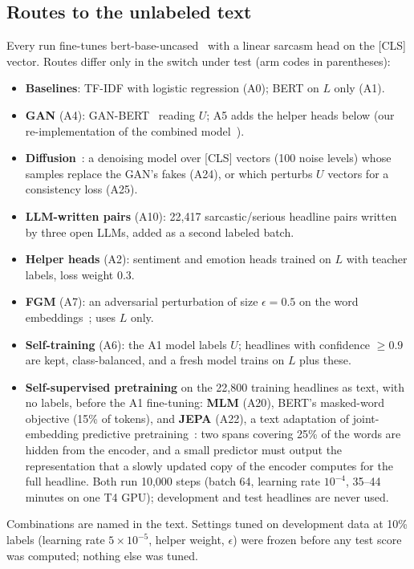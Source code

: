 \documentclass[conference]{IEEEtran}
\newcommand{\A}[1]{\textsf{#1}}                         %
\begin{document}
\subsection{Routes to the unlabeled text}
Every run fine-tunes bert-base-uncased~\cite{devlin2019bert} with a linear sarcasm head on the [CLS] vector. Routes differ only in the switch under test (arm codes in parentheses):
\begin{itemize}
\item \textbf{Baselines}: TF-IDF with logistic regression (\A{A0}); BERT on $L$ only (\A{A1}).
\item \textbf{GAN} (\A{A4}): GAN-BERT~\cite{croce2020ganbert} reading $U$; \A{A5} adds the helper heads below (our re-implementation of the combined model~\cite{irfan2025seed}).
\item \textbf{Diffusion}~\cite{ho2020ddpm}: a denoising model over [CLS] vectors (100 noise levels) whose samples replace the GAN's fakes (\A{A24}), or which perturbs $U$ vectors for a consistency loss (\A{A25}).
\item \textbf{LLM-written pairs} (\A{A10}): 22,417 sarcastic/serious headline pairs written by three open LLMs, added as a second labeled batch.
\item \textbf{Helper heads} (\A{A2}): sentiment and emotion heads trained on $L$ with teacher labels, loss weight 0.3.
\item \textbf{FGM} (\A{A7}): an adversarial perturbation of size $\epsilon{=}0.5$ on the word embeddings~\cite{miyato2017adversarial}; uses $L$ only.
\item \textbf{Self-training} (\A{A6}): the \A{A1} model labels $U$; headlines with confidence $\geq 0.9$ are kept, class-balanced, and a fresh model trains on $L$ plus these.
\item \textbf{Self-supervised pretraining} on the 22,800 training headlines as text, with no labels, before the \A{A1} fine-tuning: \textbf{MLM} (\A{A20}), BERT's masked-word objective (15\% of tokens), and \textbf{JEPA} (\A{A22}), a text adaptation of joint-embedding predictive pretraining~\cite{assran2023ijepa}: two spans covering 25\% of the words are hidden from the encoder, and a small predictor must output the representation that a slowly updated copy of the encoder computes for the full headline. Both run 10,000 steps (batch 64, learning rate $10^{-4}$, 35--44 minutes on one T4 GPU); development and test headlines are never used.
\end{itemize}
Combinations are named in the text. Settings tuned on development data at 10\% labels (learning rate $5{\times}10^{-5}$, helper weight, $\epsilon$) were frozen before any test score was computed; nothing else was tuned.
\end{document}
